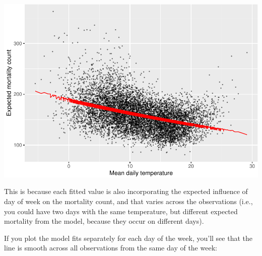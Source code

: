 \documentclass[
]{book}
\newenvironment{Shaded}{\begin{snugshade}}{\end{snugshade}}
\newcommand{\DataTypeTok}[1]{\textcolor[rgb]{0.13,0.29,0.53}{#1}}
\newcommand{\FloatTok}[1]{\textcolor[rgb]{0.00,0.00,0.81}{#1}}
\newcommand{\KeywordTok}[1]{\textcolor[rgb]{0.13,0.29,0.53}{\textbf{#1}}}
\newcommand{\NormalTok}[1]{#1}
\newcommand{\OperatorTok}[1]{\textcolor[rgb]{0.81,0.36,0.00}{\textbf{#1}}}
\newcommand{\StringTok}[1]{\textcolor[rgb]{0.31,0.60,0.02}{#1}}
\begin{document}
\includegraphics{adv_epi_analysis_files/figure-latex/unnamed-chunk-37-1.pdf}

This is because each fitted value is also incorporating the expected influence
of day of week on the mortality count, and that varies across the observations
(i.e., you could have two days with the same temperature, but different
expected mortality from the model, because they occur on different days).

If you plot the model fits separately for each day of the week, you'll see that
the line is smooth across all observations from the same day of the week:

\begin{Shaded}
\end{Shaded}
\end{document}
